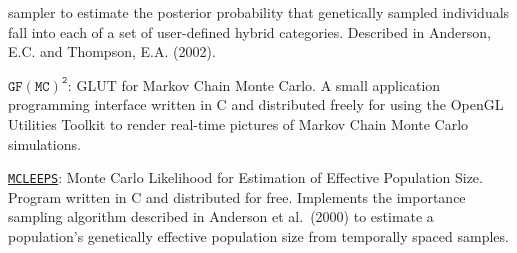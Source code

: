 \documentclass[11pt]{article}
\newlength{\postskip}
\begin{document}
\begin{description}
sampler to estimate the posterior probability that genetically sampled individuals fall into each of a
set of user-defined hybrid categories. Described in Anderson, E.C. and Thompson, E.A.
(2002).
\item[]\href{http://ib.berkeley.edu/labs/slatkin/eriq/software/software.htm}{$\mathtt{GF(MC)^2}$}: GLUT for Markov Chain Monte Carlo. A small application programming
interface written in C and distributed freely for using the OpenGL
Utilities Toolkit to render real-time pictures of Markov Chain Monte Carlo simulations.
\item[]\href{http://www.stat.washington.edu/thompson/Genepi/Mcleeps.shtml}{\texttt{MCLEEPS}}: Monte Carlo Likelihood for Estimation of Effective Population Size. Program
written in C and distributed for free. Implements the importance sampling
algorithm described in Anderson et al.~(2000) to estimate a
population's genetically effective population size from temporally spaced samples. 

\end{description}
\vspace*{\postskip}
\end{document}
